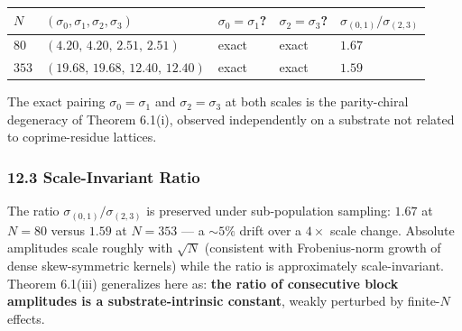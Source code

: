 \documentclass[
  11pt,
]{article}
\newcounter{none} %
\begin{document}
{\def\LTcaptype{none} %
\begin{longtable}[]{@{}
  >{\raggedright\arraybackslash}p{}
  >{\raggedright\arraybackslash}p{}
  >{\raggedright\arraybackslash}p{}
  >{\raggedright\arraybackslash}p{}
  >{\raggedleft\arraybackslash}p{}@{}}
\toprule\noalign{}
\begin{minipage}[b]{\linewidth}\raggedright
\(N\)
\end{minipage} & \begin{minipage}[b]{\linewidth}\raggedright
\((\sigma_0, \sigma_1, \sigma_2, \sigma_3)\)
\end{minipage} & \begin{minipage}[b]{\linewidth}\raggedright
\(\sigma_0 = \sigma_1\)?
\end{minipage} & \begin{minipage}[b]{\linewidth}\raggedright
\(\sigma_2 = \sigma_3\)?
\end{minipage} & \begin{minipage}[b]{\linewidth}\raggedleft
\(\sigma_{(0,1)}/\sigma_{(2,3)}\)
\end{minipage} \\
\midrule\noalign{}
\endhead
\bottomrule\noalign{}
\endlastfoot
\(80\) & \((4.20,\,4.20,\,2.51,\,2.51)\) & exact & exact & \(1.67\) \\
\(353\) & \((19.68,\,19.68,\,12.40,\,12.40)\) & exact & exact &
\(1.59\) \\
\end{longtable}
}

The exact pairing \(\sigma_0 = \sigma_1\) and \(\sigma_2 = \sigma_3\) at
both scales is the parity-chiral degeneracy of Theorem 6.1(i), observed
independently on a substrate not related to coprime-residue lattices.

\subsubsection{12.3 Scale-Invariant Ratio}\label{scale-invariant-ratio}

The ratio \(\sigma_{(0,1)}/\sigma_{(2,3)}\) is preserved under
sub-population sampling: \(1.67\) at \(N = 80\) versus \(1.59\) at
\(N = 353\) --- a \(\sim 5\%\) drift over a \(4\times\) scale change.
Absolute amplitudes scale roughly with \(\sqrt N\) (consistent with
Frobenius-norm growth of dense skew-symmetric kernels) while the ratio
is approximately scale-invariant. Theorem 6.1(iii) generalizes here as:
\textbf{the ratio of consecutive block amplitudes is a
substrate-intrinsic constant}, weakly perturbed by finite-\(N\) effects.
\end{document}
